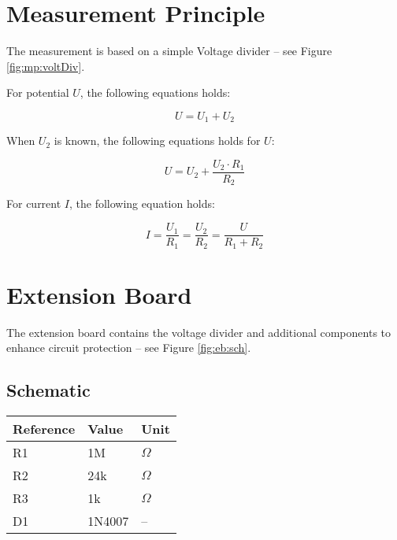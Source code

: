 \clearpage 
{} 
\pagestyle{headings} 

\clearpage
\section{Measurement Principle}
The measurement is based on a simple Voltage divider -- see Figure \ref{fig:mp:voltDiv}.


For potential $U$, the following equations holds:

\begin{equation}
U = U_1 + U_2
\end{equation}

When $U_2$ is known, the following equations holds for $U$:

\begin{equation}
U = U_2 + \frac{U_2 \cdot R_1}{R_2}
\end{equation}



For current $I$, the following equation holds:

\begin{equation}
I = \frac{U_1}{R_1} = \frac{U_2}{R_2} = \frac{U}{R_1 + R_2}
\end{equation}

\clearpage
\section{Extension Board}
The extension board contains the voltage divider and additional components to enhance circuit protection -- see Figure \ref{fig:eb:sch}.

\subsection{Schematic}

\begin{table*}[!ht]
    \begin{tabular}{| p{2cm} | p{2cm} | p{1.5cm} |}
        \hline
        \rowcolor{SeaGreen3!30!} {\bf Reference} & {\bf Value} & {\bf Unit} \\
        \hline
        \hline
        R1 & 1M & $\Omega$ \\
        \hline
        R2 & 24k & $\Omega$ \\
        \hline
        R3 & 1k & $\Omega$ \\
        \hline
        D1 & 1N4007 & -- \\
        \hline
    \end{tabular}
    \label{tab:eb:values}
   \end{table*}

